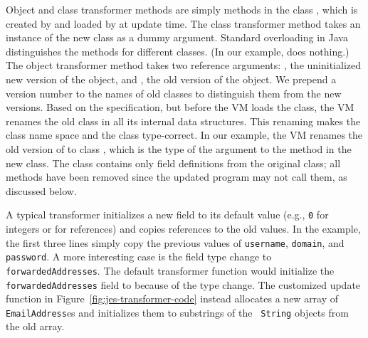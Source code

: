 Object and class transformer methods are simply \static methods in the
class \JT, which is created by \UPT and loaded by \JV at update time. The
class transformer method \JC takes an instance of the new class as a dummy
argument. Standard overloading in Java distinguishes the \JC methods for
different classes. (In our example, \JC does nothing.) The object
transformer method \JO takes two reference arguments: \TO, the
uninitialized new version of the object, and \FROM, the old version of
the object. We prepend a version number to the names of old classes to
distinguish them from the new versions. Based on the \UPT specification,
but before the VM loads the \JT class, the VM renames the old class in all
its internal data structures.  This renaming makes the class name space and
the \JT class type-correct. In our example, the VM renames the old version
of \User to class \oUser, which is the type of the \FROM argument to
the \JO method in the new \User class. The \oUser class contains only field
definitions from the original class; all methods have been removed since
the updated program may not call them, as discussed below.

A typical transformer initializes a new field to its default value (e.g.,
{\tt 0} for integers or \NULL for references) and copies references to
the old values.  In the example, the first three lines simply copy the
previous values of {\tt username}, {\tt domain}, and {\tt password}.  A
more interesting case is the field type change to {\tt forwardedAddresses}.
The default transformer function would initialize the {\tt
forwardedAddresses} field to \NULL because of the type change.
The customized update function in Figure~\ref{fig:jes-transformer-code}
instead allocates a new array
of {\tt EmailAddress}es and initializes them to substrings of the {\tt
String} objects from the old array.  

